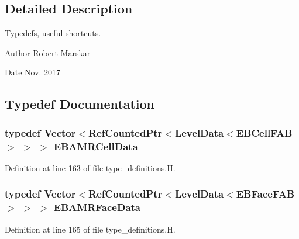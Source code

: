 \subsection{Detailed Description}
Typedefs, useful shortcuts. 

\begin{DoxyAuthor}{Author}
Robert Marskar 
\end{DoxyAuthor}
\begin{DoxyDate}{Date}
Nov. 2017 
\end{DoxyDate}


\subsection{Typedef Documentation}
\subsubsection[{\texorpdfstring{E\+B\+A\+M\+R\+Cell\+Data}{EBAMRCellData}}]{\setlength{\rightskip}{0pt plus 5cm}typedef Vector$<$Ref\+Counted\+Ptr$<$Level\+Data$<$E\+B\+Cell\+F\+AB$>$ $>$ $>$ {\bf E\+B\+A\+M\+R\+Cell\+Data}}\hypertarget{type__definitions_8H_a7e610f301989e5e07781c5e338bdb7c3}{}\label{type__definitions_8H_a7e610f301989e5e07781c5e338bdb7c3}


Definition at line 163 of file type\+\_\+definitions.\+H.

\subsubsection[{\texorpdfstring{E\+B\+A\+M\+R\+Face\+Data}{EBAMRFaceData}}]{\setlength{\rightskip}{0pt plus 5cm}typedef Vector$<$Ref\+Counted\+Ptr$<$Level\+Data$<$E\+B\+Face\+F\+AB$>$ $>$ $>$ {\bf E\+B\+A\+M\+R\+Face\+Data}}\hypertarget{type__definitions_8H_a4f1866267c9e1b765c485183872dcfbc}{}\label{type__definitions_8H_a4f1866267c9e1b765c485183872dcfbc}


Definition at line 165 of file type\+\_\+definitions.\+H.

